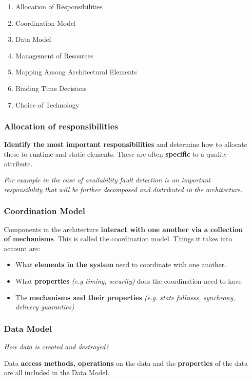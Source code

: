 \documentclass[a4paper]{article}
\begin{document}
\begin{enumerate}
\item Allocation of Responsibilities
\item Coordination Model
\item Data Model
\item Management of Resources
\item Mapping Among Architectural Elements
\item Binding Time Decisions
\item Choice of Technology
\end{enumerate}


\subsubsection{Allocation of responsibilities}
\textbf{Identify the most important responsibilities} and determine how to allocate these to runtime and static elements. These are often \textbf{specific} to a quality attribute. 

\textit{For example in the case of availability fault detection is an important responsibility that will be further decomposed and distributed in the architecture.}


\subsubsection{Coordination Model}
Components in the architecture \textbf{interact with one another via a collection of mechanisms}. This is called the coordination model. Things it takes into account are:
\begin{itemize}
\item What \textbf{elements in the system} need to coordinate with one another.
\item What \textbf{properties} \textit{(e.g timing, security)} does the coordination need to have
\item The \textbf{mechanisms and their properties} \textit{(e.g. state fullness, synchrony, delivery guaranties)}
\end{itemize}

\subsubsection{Data Model}

\textit{How data is created and destroyed?}

Data \textbf{access methods, operations} on the data and the \textbf{properties} of the data are all included in the Data Model. 
\end{document}
